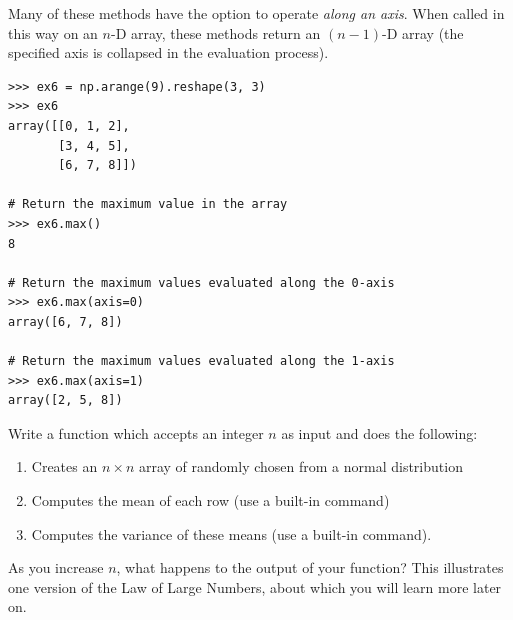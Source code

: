 Many of these methods have the option to operate \emph{along an axis}. 
When called in this way on an $n$-D array, these methods return an $(n-1)$-D array (the specified axis is collapsed in the evaluation process).

\begin{lstlisting}
>>> ex6 = np.arange(9).reshape(3, 3)
>>> ex6
array([[0, 1, 2],
       [3, 4, 5],
       [6, 7, 8]])
       
# Return the maximum value in the array
>>> ex6.max() 
8

# Return the maximum values evaluated along the 0-axis
>>> ex6.max(axis=0)
array([6, 7, 8])

# Return the maximum values evaluated along the 1-axis
>>> ex6.max(axis=1)
array([2, 5, 8])
\end{lstlisting}


\begin{problem}
Write a function which accepts an integer $n$ as input and does the following:
\begin{enumerate}
\item Creates an $n\times n$ array of  randomly chosen from a normal distribution
\item Computes the mean of each row (use a built-in command)
\item Computes the variance of these means (use a built-in command).
\end{enumerate}
As you increase $n$, what happens to the output of 
your function? This illustrates one version of
the Law of Large Numbers, about which you will learn more later on.
\end{problem}

